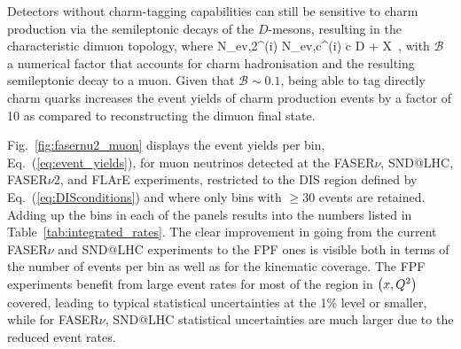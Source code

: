   Detectors without charm-tagging capabilities can still be sensitive to charm production via
  the semileptonic decays of the $D$-mesons, resulting in the characteristic
  dimuon topology, where
  \be
 N_{\rm ev,2\mu}^{(i)} \approx N_{\rm ev,c}^{(i)} \times {}\lp c \to D \to \mu + X\rp \, ,
 \ee
 with $\mathcal{B}$ a numerical factor that accounts for charm hadronisation and the
 resulting semileptonic decay to a muon.
 Given that $\mathcal{B}\sim 0.1$, being able to tag directly charm quarks increases the event yields
 of charm production events by a factor of 10 as compared to reconstructing the dimuon final state.

 Fig.~\ref{fig:fasernu2_muon} displays the
 event yields per bin,  Eq.~(\ref{eq:event_yields}),
 for muon neutrinos detected at the
 FASER$\nu$, SND@LHC, FASER$\nu$2, and FLArE  experiments,
 restricted
 to the DIS region defined by Eq.~(\ref{eq:DISconditions})
 and where only bins with $\ge 30$ events are retained.
 Adding up the bins in each of the panels results into the numbers listed in
 Table~\ref{tab:integrated_rates}.
 The clear improvement in going from the current FASER$\nu$ and SND@LHC
 experiments to the FPF ones is visible both in terms
 of the number
 of events per bin as well as for the kinematic coverage.
 The FPF experiments benefit from large
 event rates for most of the region in $\left( x,Q^2\right)$ covered,
 leading to typical statistical uncertainties at the 1\% level or smaller,
 while for FASER$\nu$, SND@LHC statistical uncertainties are much larger due
 to the reduced event rates.
  
